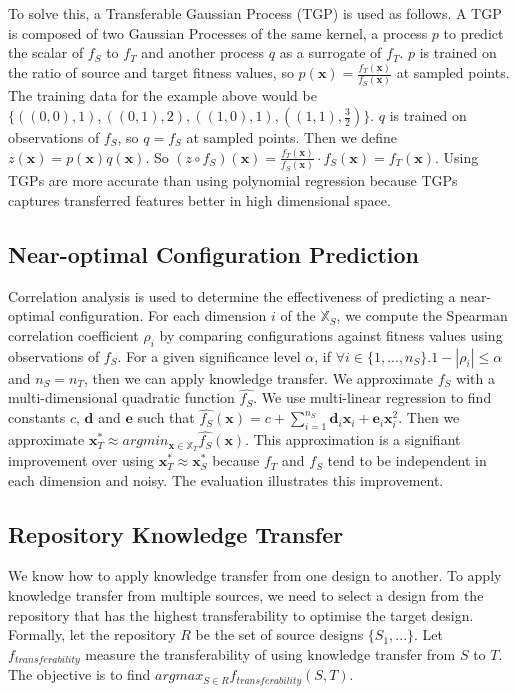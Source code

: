 \documentclass[10pt,a4paper]{article}
\begin{document}
To solve this, a Transferable Gaussian Process (TGP) is used as follows. A TGP is composed of two Gaussian Processes of the same kernel, a process $p$ to predict the scalar of $f_S$ to $f_T$ and another process $q$ as a surrogate of $f_T$. $p$ is trained on the ratio of source and target fitness values, so $p(\mathbf{x})=\frac{f_T(\mathbf{x})}{f_S(\mathbf{x})}$ at sampled points. The training data for the example above would be $\{((0,0),1),((0,1),2),((1,0),1),((1,1),\frac{3}{2})\}$. $q$ is trained on observations of $f_S$, so $q=f_S$ at sampled points. Then we define $z(\mathbf{x})=p(\mathbf{x})q(\mathbf{x})$. So $(z\circ f_S)(\mathbf{x})=\frac{f_T(\mathbf{x})}{f_S(\mathbf{x})}\cdot f_S(\mathbf{x})=f_T(\mathbf{x})$. Using TGPs are more accurate than using polynomial regression because TGPs captures transferred features better in high dimensional space.

\subsection{Near-optimal Configuration Prediction}
Correlation analysis is used to determine the effectiveness of predicting a near-optimal configuration. For each dimension $i$ of the $\mathbb{X}_S$, we compute the Spearman correlation coefficient $\rho_i$ by comparing configurations against fitness values using observations of $f_S$. For a given significance level $\alpha$, if $\forall i\in\{1,...,n_S\}.1-|\rho_i|\le\alpha$ and $n_S=n_T$, then we can apply knowledge transfer. We approximate $f_S$ with a multi-dimensional quadratic function $\hat{f_S}$\cite{Xi2004}. We use multi-linear regression to find constants $c$, $\mathbf{d}$ and $\mathbf{e}$ such that $\hat{f_S}(\mathbf{x})=c+\sum_{i=1}^{n_S}\mathbf{d}_i \mathbf{x}_i+\mathbf{e}_i \mathbf{x}_i^2$. Then we approximate $\mathbf{x}_T^*\approx argmin_{\mathbf{x}\in\mathbb{X}_T}\hat{f_S}(\mathbf{x})$. This approximation is a signifiant improvement over using $\mathbf{x}_T^*\approx\mathbf{x}_S^*$ because $f_T$ and $f_S$ tend to be independent in each dimension and noisy. The evaluation illustrates this improvement.

\subsection{Repository Knowledge Transfer}

We know how to apply knowledge transfer from one design to another. To apply knowledge transfer from multiple sources, we need to select a design from the repository that has the highest transferability to optimise the target design. Formally, let the repository $R$ be the set of source designs $\{S_1,...\}$. Let $f_{transferability}$ measure the transferability of using knowledge transfer from $S$ to $T$. The objective is to find $argmax_{S\in R}f_{transferability}(S,T)$.
\end{document}
